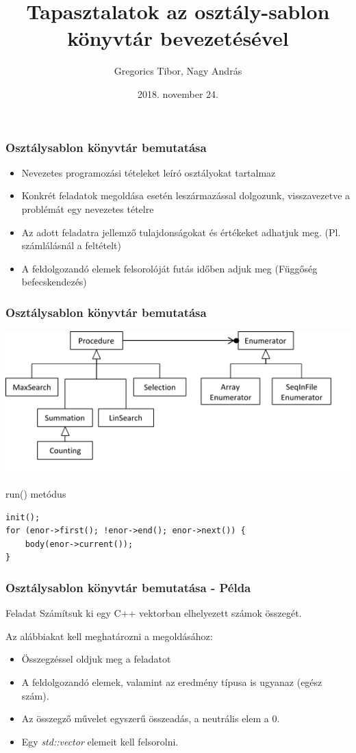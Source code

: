 \documentclass[11pt]{beamer}
\author{Gregorics Tibor, Nagy András}
\title{Tapasztalatok az osztály-sablon könyvtár bevezetésével}
\date{2018. november 24.}
\begin{document}
\begin{frame}
\titlepage
\end{frame}

\begin{frame}
	\frametitle{Osztálysablon könyvtár bemutatása}
	
	\begin{itemize}
		\item Nevezetes programozási tételeket leíró osztályokat tartalmaz
		\item Konkrét feladatok megoldása esetén leszármazással dolgozunk, visszavezetve a problémát egy nevezetes tételre
		\item Az adott feladatra jellemző tulajdonságokat és értékeket adhatjuk meg. (Pl. számlálásnál a feltételt)
		\item A feldolgozandó elemek felsorolóját futás időben adjuk meg (Függőség befecskendezés)
	\end{itemize}
\end{frame}

\begin{frame}[fragile]
	\frametitle{Osztálysablon könyvtár bemutatása}
	\includegraphics[scale=0.8]{sablon_hiearhica.png}
	
	\begin{block}{run() metódus}
		\begin{lstlisting}[basicstyle=\small]
init();
for (enor->first(); !enor->end(); enor->next()) {
    body(enor->current());
}
		\end{lstlisting}
	\end{block}
	
\end{frame}


\begin{frame}[fragile]
	\frametitle{Osztálysablon könyvtár bemutatása - Példa}	
	\begin{block}{Feladat}
		Számítsuk ki egy C++ vektorban elhelyezett számok összegét.
	\end{block}
	
	Az alábbiakat kell meghatározni a megoldásához:
	\begin{itemize}
		\item Összegzéssel oldjuk meg a feladatot
		\item A feldolgozandó elemek, valamint az eredmény típusa is ugyanaz (egész szám).
		\item Az összegző művelet egyszerű összeadás, a neutrális elem a 0.
		\item Egy \textit{std::vector} elemeit kell felsorolni.
	\end{itemize}

	
\end{frame}
\end{document}
